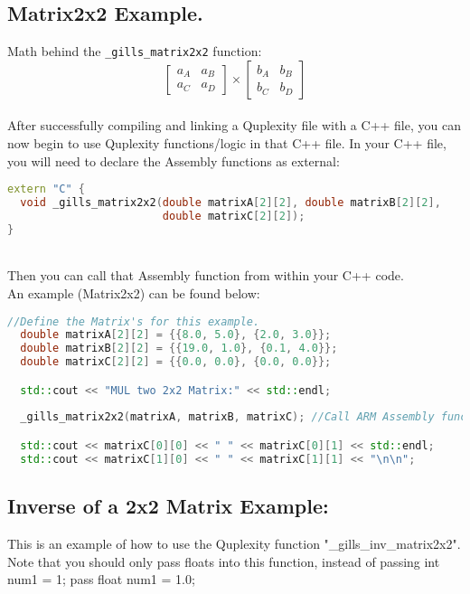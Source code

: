 \documentclass{article}
\begin{document}
\newpage

\subsection*{Matrix2x2 Example.}
Math behind the \texttt{\_gills\_matrix2x2} function:
\[
\begin{bmatrix}
  a_{A} & a_{B} \\
  a_{C} & a_{D}
\end{bmatrix}
\times
\begin{bmatrix}
  b_{A} & b_{B} \\
  b_{C} & b_{D}
\end{bmatrix}
\] \\
\noindent After successfully compiling and linking a Quplexity file with a C++ file, you can now begin to use Quplexity functions/logic in that C++ file. In your C++ file, you will need to declare the Assembly functions as external: \\

\begin{lstlisting}[language=C++, frame=single]
extern "C" {
  void _gills_matrix2x2(double matrixA[2][2], double matrixB[2][2], 
                        double matrixC[2][2]);
}
\end{lstlisting}

\noindent \\Then you can call that Assembly function from within your C++ code. \\
An example (Matrix2x2) can be found below: \\
\begin{lstlisting}[language=C++, frame=single]
  //Define the Matrix's for this example.
  double matrixA[2][2] = {{8.0, 5.0}, {2.0, 3.0}};
  double matrixB[2][2] = {{19.0, 1.0}, {0.1, 4.0}};
  double matrixC[2][2] = {{0.0, 0.0}, {0.0, 0.0}};

  std::cout << "MUL two 2x2 Matrix:" << std::endl;
  
  _gills_matrix2x2(matrixA, matrixB, matrixC); //Call ARM Assembly function.

  std::cout << matrixC[0][0] << " " << matrixC[0][1] << std::endl;
  std::cout << matrixC[1][0] << " " << matrixC[1][1] << "\n\n";
\end{lstlisting}

\subsection*{Inverse of a 2x2 Matrix Example:}
This is an example of how to use the Quplexity function "\_gills\_inv\_matrix2x2". 
Note that you should only pass floats into this function, instead of passing int num1 = 1; pass float num1 = 1.0;
\end{document}
